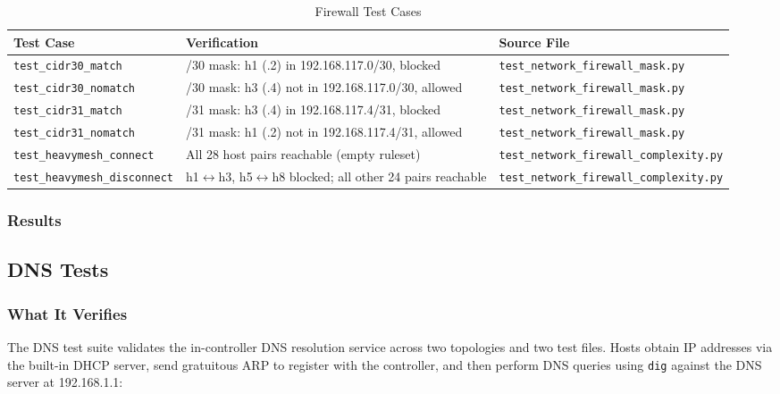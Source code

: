 \documentclass[12pt,a4paper]{article}
\begin{document}
\begin{table}[H]
\centering
\begin{tabular}{@{}p{5cm}p{4.5cm}p{4cm}@{}}
\toprule
\textbf{Test Case} & \textbf{Verification} & \textbf{Source File} \\
\midrule
\texttt{test\_cidr30\_match} & /30 mask: h1 (.2) in 192.168.117.0/30, blocked & \texttt{test\_network\_firewall\_mask.py} \\
\texttt{test\_cidr30\_nomatch} & /30 mask: h3 (.4) not in 192.168.117.0/30, allowed & \texttt{test\_network\_firewall\_mask.py} \\
\texttt{test\_cidr31\_match} & /31 mask: h3 (.4) in 192.168.117.4/31, blocked & \texttt{test\_network\_firewall\_mask.py} \\
\texttt{test\_cidr31\_nomatch} & /31 mask: h1 (.2) not in 192.168.117.4/31, allowed & \texttt{test\_network\_firewall\_mask.py} \\
\texttt{test\_heavymesh\_connect} & All 28 host pairs reachable (empty ruleset) & \texttt{test\_network\_firewall\_complexity.py} \\
\texttt{test\_heavymesh\_disconnect} & h1$\leftrightarrow$h3, h5$\leftrightarrow$h8 blocked; all other 24 pairs reachable & \texttt{test\_network\_firewall\_complexity.py} \\
\bottomrule
\end{tabular}
\caption{Firewall Test Cases}
\end{table}

\subsubsection{Results}

\begin{center}
\end{center}

\subsection{DNS Tests}

\subsubsection{What It Verifies}

The DNS test suite validates the in-controller DNS resolution service across two topologies and two test files. Hosts obtain IP addresses via the built-in DHCP server, send gratuitous ARP to register with the controller, and then perform DNS queries using \texttt{dig} against the DNS server at 192.168.1.1:
\end{document}
